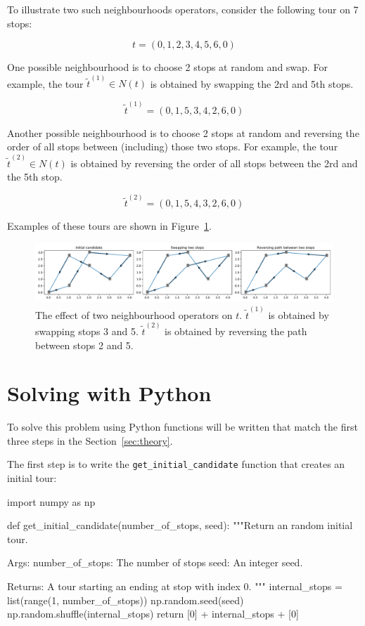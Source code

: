 To illustrate two such neighbourhoods operators, consider the following tour on
7 stops:

\[
    t = (0, 1, 2, 3, 4, 5, 6, 0)
\]

One possible neighbourhood is to choose 2 stops at random and swap. For
example, the tour \(\tilde t^{(1)}\in N(t)\) is obtained by swapping the 2rd and 5th
stops.

\[
    \tilde t^{(1)} = (0, 1, 5, 3, 4, 2, 6, 0)
\]

Another possible neighbourhood is to choose 2 stops at random and reversing the
order of all stops between (including) those two stops. For example, the tour
\(\tilde t^{(2)} \in N(t)\) is obtained by reversing the order of all stops between
the 2rd and the 5th stop.

\[
    \tilde t^{(2)} = (0, 1, 5, 4, 3, 2, 6, 0)
\]

Examples of these tours are shown in
Figure~\ref{fig:tsp-effect-of-neighbourhood-operators}.

\begin{figure}[!hbtp]
    \begin{center}
        \includegraphics[width=\textwidth]{./assets/tsp-effect-of-neighbourhood-operators/main.pdf}
    \end{center}
    \caption{The effect of two neighbourhood operators on \(t\). \(\tilde t^{(1)}\) is
    obtained by swapping stops 3 and 5. \(\tilde t^{(2)}\) is obtained by reversing the
    path between stops 2 and 5.}
    \label{fig:tsp-effect-of-neighbourhood-operators}
\end{figure}

\section{Solving with Python}\label{sec:solving-with-python}

To solve this problem using Python functions will be written that match the
first three steps in the Section~\ref{sec:theory}.

The first step is to write the \texttt{get_initial_candidate}
function that creates an initial tour:

\begin{pyin}
import numpy as np


def get_initial_candidate(number_of_stops, seed):
    """Return an random initial tour.

    Args:
        number_of_stops: The number of stops
        seed: An integer seed.

    Returns:
        A tour starting an ending at stop with index 0.
    """
    internal_stops = list(range(1, number_of_stops))
    np.random.seed(seed)
    np.random.shuffle(internal_stops)
    return [0] + internal_stops + [0]
\end{pyin}


